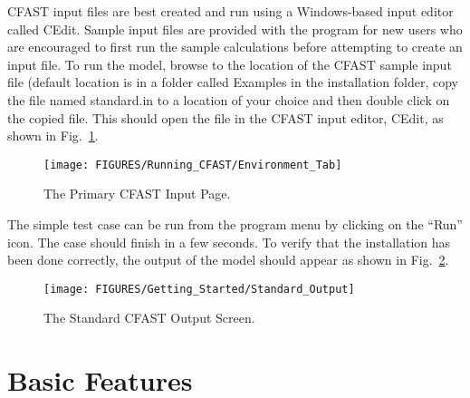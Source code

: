 CFAST input files are best created and run using a Windows-based input editor called CEdit. Sample input files are provided with the program for new users who are encouraged to first run the sample calculations before attempting to create an input file. To run the model, browse to the location of the CFAST sample input file (default location is in a folder called {\ct Examples} in the installation folder, copy the file named {\ct standard.in} to a location of your choice and then double click on the copied file. This should open the file in the CFAST input editor, CEdit, as shown in Fig.~\ref{primary_screen}.
\begin{figure}[h!]
\texttt{[image: FIGURES/Running\_CFAST/Environment\_Tab]}
\caption[The Primary CFAST Input Page]{The Primary CFAST Input Page.}
\label{primary_screen}
\end{figure}
The simple test case can be run from the program menu by clicking on the ``Run'' icon. The case should finish in a few seconds. To verify that the installation has been done correctly, the output of the model should appear as shown in Fig.~\ref{Run_Model}.
\begin{figure}[h!]
\texttt{[image: FIGURES/Getting\_Started/Standard\_Output]}
\caption[The Standard CFAST Output Screen]{The Standard CFAST Output Screen.}
\label{Run_Model}
\end{figure}


\section{Basic Features}

